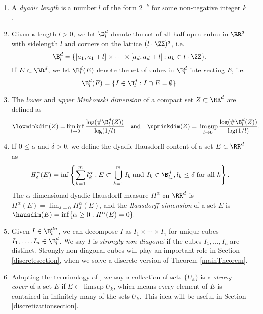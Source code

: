 \begin{enumerate}%
	\item A {\it dyadic length} is a number $l$ of the form $2^{-k}$ for some non-negative integer $k$.

	\item Given a length $l > 0$, we let $\B^d_l$ denote the set of all half open cubes in $\RR^d$ with sidelength $l$ and corners on the lattice $(l \cdot \ZZ)^d$, i.e.
	\[ \B^d_l = \{ [a_1, a_1 + l] \times \cdots \times [a_d, a_d+l] : a_k \in l \cdot \ZZ \}. \]
	If $E \subset \RR^d$, we let $\B^d_l(E)$ denote the set of cubes in $\B^d_l$ intersecting $E$, i.e.
	\[ \B^d_l(E) = \{ I \in \B^d_l: I \cap E = \emptyset \}. \]

	\item\label{defnMinkowskiDim} The {\it lower} and {\it upper Minkowski dimension} of a compact set $Z \subset \RR^d$ are defined as
	\[		\lowminkdim(Z) = \liminf_{l \to 0} \frac{\log(\# \B^d_l(Z))}{\log(1/l)}\quad \text{and}\quad \upminkdim(Z) = \limsup_{l \to 0} \frac{\log(\# \B^d_l(Z))}{\log(1/l)}. \]

	\item If $0 \leq \alpha$ and $\delta > 0$, we define the dyadic Hausdorff content of a set $E\subset\RR^d$ as 
	\[ H^\alpha_\delta(E) = \inf \left\{ \sum_{k = 1}^m l_k^\alpha : E \subset \bigcup_{k = 1}^m I_k\ \text{and}\ I_k \in \B^d_{l_k}, l_k \leq \delta\ \text{for all $k$} \right\}. \]
	The $\alpha$-dimensional dyadic Hausdorff measure $H^\alpha$ on $\RR^d$ is $H^\alpha(E) = \lim_{\delta \to 0} H_\delta^\alpha(E)$, and the {\it Hausdorff dimension} of a set $E$ is $\hausdim(E) = \inf \{ \alpha \geq 0 : H^\alpha(E) = 0 \}$.

	\item \label{stronglyNonDiagonalDef}Given $I \in \B^{dn}_l$, we can decompose $I$ as $I_1 \times \cdots \times I_n$ for unique cubes $I_1, \dots, I_n \in \B_l^d$. We say $I$ is {\it strongly non-diagonal} if the cubes $I_1, \dots, I_n$ are distinct. Strongly non-diagonal cubes will play an important role in Section \ref{discretesection}, when we solve a discrete version of Theorem \ref{mainTheorem}.

	\item\label{strongCoverDefn} Adopting the terminology of \cite{KatzTao}, we say a collection of sets $\{ U_k \}$ is a {\it strong cover} of a set $E$ if $E \subset \limsup U_k$, which means every element of $E$ is contained in infinitely many of the sets $U_k$. This idea will be useful in Section \ref{discretizationsection}.  


\end{enumerate}
